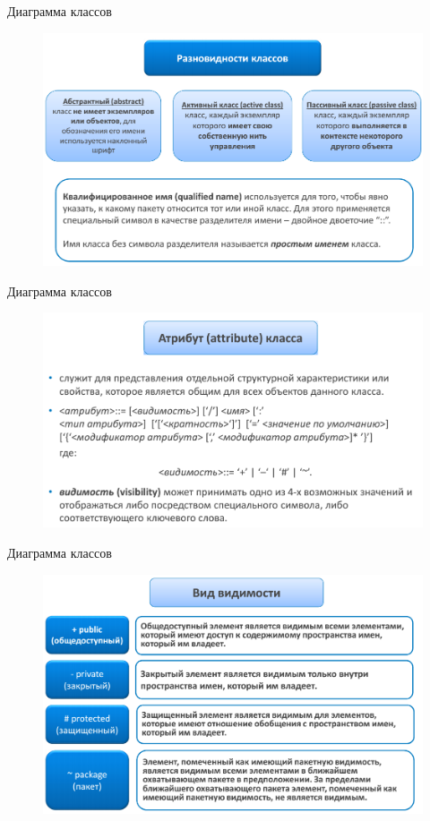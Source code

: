 \documentclass{beamer}
\begin{document}
\begin{frame}[t]{Диаграмма классов}
\begin{figure}[h]
\centering
\includegraphics[scale=0.45]{images/lec03-pic20.png}
\end{figure}
\end{frame}

\begin{frame}[t]{Диаграмма классов}
\begin{figure}[h]
\centering
\includegraphics[scale=0.45]{images/lec03-pic21.png}
\end{figure}
\end{frame}

\begin{frame}[t]{Диаграмма классов}
\begin{figure}[h]
\centering
\includegraphics[scale=0.45]{images/lec03-pic22.png}
\end{figure}
\end{frame}
\end{document}
